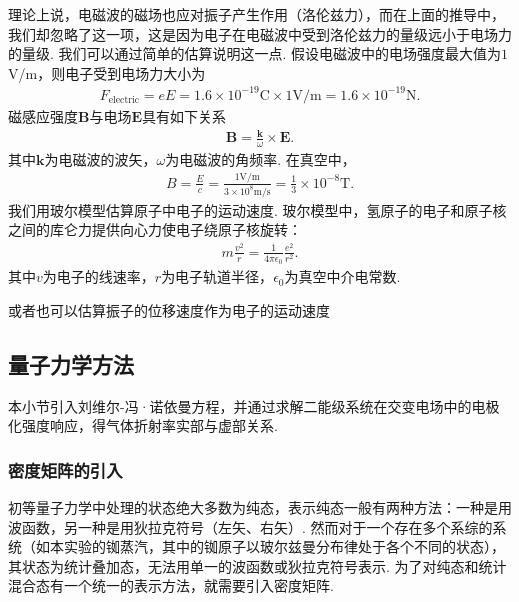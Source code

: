 \documentclass{assignment}
\begin{document}
理论上说，电磁波的磁场也应对振子产生作用（洛伦兹力），而在上面的推导中，我们却忽略了这一项，这是因为电子在电磁波中受到洛伦兹力的量级远小于电场力的量级. 我们可以通过简单的估算说明这一点. 假设电磁波中的电场强度最大值为$1$V/m，则电子受到电场力大小为
\begin{align}
    F_{\text{electric}}=eE=1.6\times 10^{-19}\text{C}\times 1\text{V/m}=1.6\times 10^{-19}\text{N}.
\end{align}
磁感应强度$\bm{B}$与电场$\bm{E}$具有如下关系
\begin{align}
    \bm{B}=\frac{\bm{k}}{\omega}\times\bm{E}.
\end{align}
其中$\bm{k}$为电磁波的波矢，$\omega$为电磁波的角频率.
在真空中，
\begin{align}
    B=\frac{E}{c}=\frac{1\text{V/m}}{3\times 10^8\text{m/s}}=\frac{1}{3}\times 10^{-8}\text{T}.
\end{align}
我们用玻尔模型估算原子中电子的运动速度. 玻尔模型中，氢原子的电子和原子核之间的库仑力提供向心力使电子绕原子核旋转：
\begin{align}
    m\frac{v^2}{r}=\frac{1}{4\pi\epsilon_0}\frac{e^2}{r^2}.
\end{align}
其中$v$为电子的线速率，$r$为电子轨道半径，$\epsilon_0$为真空中介电常数.

或者也可以估算振子的位移速度作为电子的运动速度

\subsection{量子力学方法}
本小节引入刘维尔-冯·诺依曼方程，并通过求解二能级系统在交变电场中的电极化强度响应，得气体折射率实部与虚部关系.

\subsubsection{密度矩阵的引入}
初等量子力学中处理的状态绝大多数为纯态，表示纯态一般有两种方法：一种是用波函数，另一种是用狄拉克符号（左矢、右矢）. 然而对于一个存在多个系综的系统（如本实验的铷蒸汽，其中的铷原子以玻尔兹曼分布律处于各个不同的状态），其状态为统计叠加态，无法用单一的波函数或狄拉克符号表示. 为了对纯态和统计混合态有一个统一的表示方法，就需要引入密度矩阵.
\end{document}
